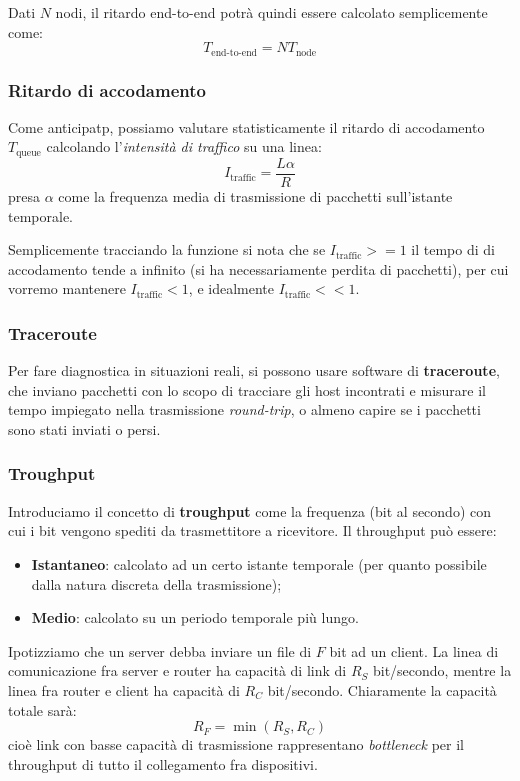 \documentclass[a4paper,11pt]{article}
\begin{document}
Dati $N$ nodi, il ritardo end-to-end potrà quindi essere calcolato semplicemente come:
$$
T_{\text{end-to-end}} = N T_{\text{node}}
$$

\subsubsection{Ritardo di accodamento}
Come anticipatp, possiamo valutare statisticamente il ritardo di accodamento $T_{\text{queue}}$ calcolando l'\textit{intensità di traffico} su una linea:
$$
I_{\text{traffic}} = \frac{L \alpha}{R}
$$
presa $\alpha$ come la frequenza media di trasmissione di pacchetti sull'istante temporale.

Semplicemente tracciando la funzione si nota che se $I_{\text{traffic}} >= 1$ il tempo di di accodamento tende a infinito (si ha necessariamente perdita di pacchetti), per cui vorremo mantenere $I_{\text{traffic}} < 1$, e idealmente $I_{\text{traffic}} << 1$.

\subsubsection{Traceroute}
Per fare diagnostica in situazioni reali, si possono usare software di \textbf{traceroute}, che inviano pacchetti con lo scopo di tracciare gli host incontrati e misurare il tempo impiegato nella trasmissione \textit{round-trip}, o almeno capire se i pacchetti sono stati inviati o persi. 

\subsubsection{Troughput}
Introduciamo il concetto di \textbf{troughput} come la frequenza (bit al secondo) con cui i bit vengono spediti da trasmettitore a ricevitore.
Il throughput può essere:
\begin{itemize}
	\item \textbf{Istantaneo}: calcolato ad un certo istante temporale (per quanto possibile dalla natura discreta della trasmissione);
	\item \textbf{Medio}: calcolato su un periodo temporale più lungo.
\end{itemize}

Ipotizziamo che un server debba inviare un file di $F$ bit ad un client.
La linea di comunicazione fra server e router ha capacità di link di $R_S$ bit/secondo, mentre la linea fra router e client ha capacità di $R_C$ bit/secondo.
Chiaramente la capacità totale sarà:
$$
R_F = \min(R_S, R_C)
$$
cioè link con basse capacità di trasmissione rappresentano \textit{bottleneck} per il throughput di tutto il collegamento fra dispositivi.
\end{document}
